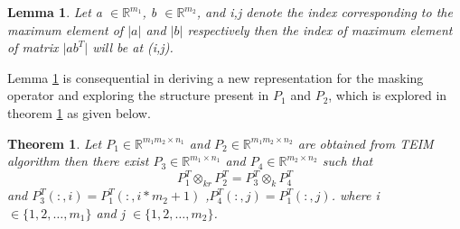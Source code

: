 \documentclass{article}
\newtheorem{theorem}{Theorem}
\newtheorem{lemma}{Lemma}
\begin{document}
\begin{lemma}\label{lem:lem521}
Let a $\in \mathbb{R}^{m_1}$, b $\in \mathbb{R}^{m_2}$, and \emph{i},\emph{j} denote the index corresponding to the maximum element of $\lvert a \rvert $ and $\lvert b \rvert $ respectively then the index of maximum element of matrix $\lvert ab^T \rvert $ will be at (i,j).
\end{lemma}
 Lemma \ref{lem:lem521} is consequential in deriving a new representation for the masking operator and exploring the structure present in  $P_1$ and $P_2$, which is explored in theorem \ref{lem:lem61} as given below.
\begin{theorem}\label{lem:lem61}
Let $P_1 \in \mathbb{R}^{ m_1m_2\times n_1 }$ and $P_2 \in \mathbb{R}^{m_1m_2 \times n_2}$ are obtained from TEIM algorithm then there exist $P_3 \in \mathbb{R}^{m_1 \times n_1}$ and $P_4 \in \mathbb{R}^{m_2 \times n_2}$ such that 
\begin{equation*}
    P_1^T\otimes_{kr}P_2^T= P_3^T \otimes_k P_4^T 
\end{equation*}
and $P_3^T(:,i) = P_1^T(:,i*m_2+1)$ ,$P_4^T(:,j) = P_1^T(:,j)$. where i $\in \{1,2,\dots,m_1\}$ and j $\in \{1,2,\dots,m_2\}$.
\end{theorem}
\end{document}
